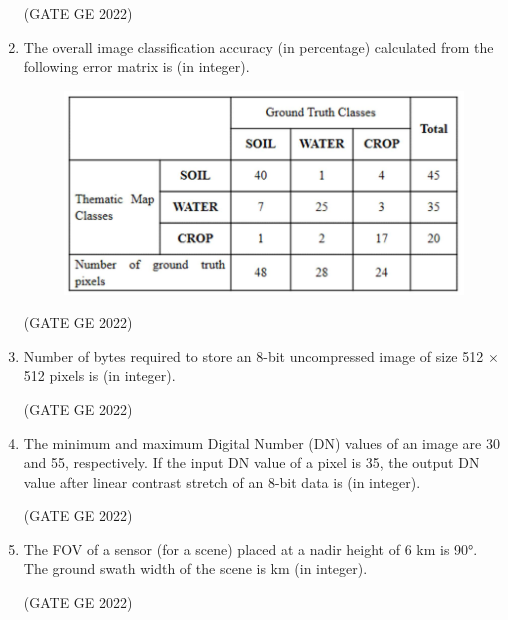 \documentclass[journal,12pt,onecolumn]{IEEEtran}
\theoremstyle{remark}
\begin{document}
\begin{enumerate}
\hfill (GATE GE 2022)

\begin{enumerate}
\end{enumerate}

\item The overall image classification accuracy (in percentage) calculated from the following error matrix is \makebox[1cm]{\hrulefill} (in integer).
\begin{figure}[H]
    \centering
    \includegraphics[width=0.8\columnwidth]{figs/fig_81.png}
    \label{fig:question81}
\end{figure}

\hfill (GATE GE 2022)

\item Number of bytes required to store an 8-bit uncompressed image of size 512 $\times$ 512 pixels is \makebox[1cm]{\hrulefill} (in integer).

\hfill (GATE GE 2022)

\item The minimum and maximum Digital Number (DN) values of an image are 30 and 55, respectively. If the input DN value of a pixel is 35, the output DN value after linear contrast stretch of an 8-bit data is \makebox[1cm]{\hrulefill} (in integer).

\hfill (GATE GE 2022)

\item The FOV of a sensor (for a scene) placed at a nadir height of 6 km is 90°. The ground swath width of the scene is \makebox[1cm]{\hrulefill} km (in integer).

\hfill (GATE GE 2022)

\end{enumerate}
\end{document}
